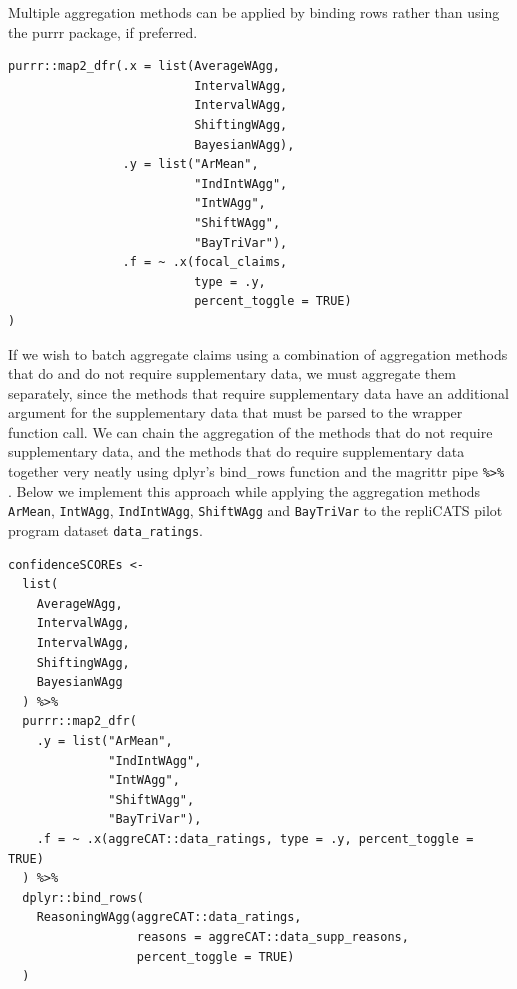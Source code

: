 \documentclass[article]{jss}
\begin{document}
\begin{codelisting}

\caption{Multiple aggregation methods can be applied by binding rows
rather than using the purrr package, if preferred.}

\hypertarget{lst-multi-method-workflow-non-supp}{%
\label{lst-multi-method-workflow-non-supp}}%
\begin{verbatim}
purrr::map2_dfr(.x = list(AverageWAgg,
                          IntervalWAgg,
                          IntervalWAgg,
                          ShiftingWAgg,
                          BayesianWAgg),
                .y = list("ArMean", 
                          "IndIntWAgg", 
                          "IntWAgg", 
                          "ShiftWAgg", 
                          "BayTriVar"),
                .f = ~ .x(focal_claims, 
                          type = .y, 
                          percent_toggle = TRUE)
)
\end{verbatim}

\end{codelisting}

\begin{codelisting}

\caption{If we wish to batch aggregate claims using a combination of
aggregation methods that do and do not require supplementary data, we
must aggregate them separately, since the methods that require
supplementary data have an additional argument for the supplementary
data that must be parsed to the wrapper function call. We can chain the
aggregation of the methods that do not require supplementary data, and
the methods that do require supplementary data together very neatly
using {dplyr}'s {bind\_rows} function \citep{dplyr2021} and the
{magrittr} pipe \texttt{\%\textgreater{}\%} \citep{magrittr2020}. Below
we implement this approach while applying the aggregation methods
\texttt{ArMean}, \texttt{IntWAgg}, \texttt{IndIntWAgg},
\texttt{ShiftWAgg} and \texttt{BayTriVar} to the repliCATS pilot program
dataset \texttt{data\_ratings}.}

\hypertarget{lst-multi-method-workflow-both}{%
\label{lst-multi-method-workflow-both}}%
\begin{verbatim}
confidenceSCOREs <-
  list(
    AverageWAgg,
    IntervalWAgg,
    IntervalWAgg,
    ShiftingWAgg,
    BayesianWAgg
  ) %>%
  purrr::map2_dfr(
    .y = list("ArMean", 
              "IndIntWAgg", 
              "IntWAgg", 
              "ShiftWAgg", 
              "BayTriVar"),
    .f = ~ .x(aggreCAT::data_ratings, type = .y, percent_toggle = TRUE)
  ) %>% 
  dplyr::bind_rows(
    ReasoningWAgg(aggreCAT::data_ratings, 
                  reasons = aggreCAT::data_supp_reasons, 
                  percent_toggle = TRUE)
  )
\end{verbatim}

\end{codelisting}
\end{document}
